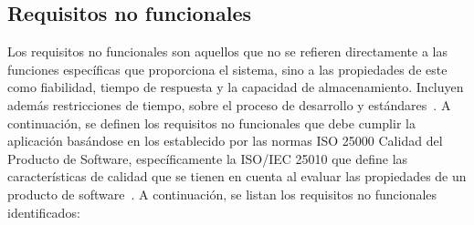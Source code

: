\subsection{Requisitos no funcionales}

Los requisitos no funcionales son aquellos que no se refieren directamente a las funciones
específicas que proporciona el sistema, sino a las propiedades de este como fiabilidad,
tiempo de respuesta y la capacidad de almacenamiento. Incluyen además restricciones de
tiempo, sobre el proceso de desarrollo y estándares~\cite{sommerville2011software}.
A continuación, se definen los requisitos no funcionales que debe cumplir la aplicación
basándose en los establecido por las normas ISO 25000 Calidad del Producto de Software,
específicamente la ISO/IEC 25010 que define las características de calidad que se tienen
en cuenta al evaluar las propiedades de un producto de software~\cite{iso25010-2023}.
A continuación, se listan los requisitos no funcionales identificados:

